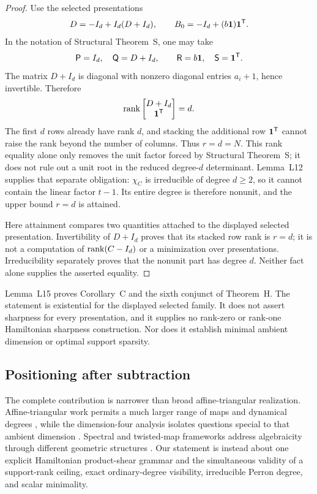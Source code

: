 \documentclass[11pt,letterpaper]{article}
\theoremstyle{plain}
\begin{document}
\begin{proof}
Use the selected presentations
\[
D=-I_d+I_d(D+I_d),\qquad
B_0=-I_d+(b\mathbf{1})\mathbf{1}^{\mathsf{T}}.
\]
In the notation of Structural Theorem~S, one may take
\[
\mathsf P=I_d,\quad \mathsf Q=D+I_d,\qquad
\mathsf R=b\mathbf{1},\quad \mathsf S=\mathbf{1}^{\mathsf{T}}.
\]
The matrix $D+I_d$ is diagonal with nonzero diagonal entries $a_i+1$, hence invertible.  Therefore
\[
\operatorname{rank}\begin{bmatrix}D+I_d\\ \mathbf{1}^{\mathsf{T}}\end{bmatrix}=d.
\]
The first $d$ rows already have rank $d$, and stacking the additional row $\mathbf{1}^{\mathsf{T}}$ cannot raise the rank beyond the number of columns.  Thus $r=d=N$.  This rank equality alone only removes the unit factor forced by Structural Theorem~S; it does not rule out a unit root in the reduced degree-$d$ determinant.  Lemma~L12 supplies that separate obligation: $\chi_C$ is irreducible of degree $d\geq2$, so it cannot contain the linear factor $t-1$.  Its entire degree is therefore nonunit, and the upper bound $r=d$ is attained.

Here attainment compares two quantities attached to the displayed selected presentation.  Invertibility of \(D+I_d\) proves that its stacked row rank is \(r=d\); it is not a computation of \(\operatorname{rank}(C-I_d)\) or a minimization over presentations.  Irreducibility separately proves that the nonunit part has degree \(d\).  Neither fact alone supplies the asserted equality.
\end{proof}

Lemma~L15 proves Corollary~C and the sixth conjunct of Theorem~H.  The statement is existential for the displayed selected family.  It does not assert sharpness for every presentation, and it supplies no rank-zero or rank-one Hamiltonian sharpness construction.  Nor does it establish minimal ambient dimension or optimal support sparsity.

\subsection{Positioning after subtraction}

The complete contribution is narrower than broad affine-triangular realization.  Affine-triangular work permits a much larger range of maps and dynamical degrees \cite{BvS}, while the dimension-four analysis isolates questions special to that ambient dimension \cite{SS}.  Spectral and twisted-map frameworks address algebraicity through different geometric structures \cite{DF,AX}.  Our statement is instead about one explicit Hamiltonian product-shear grammar and the simultaneous validity of a support-rank ceiling, exact ordinary-degree visibility, irreducible Perron degree, and scalar minimality.
\end{document}
